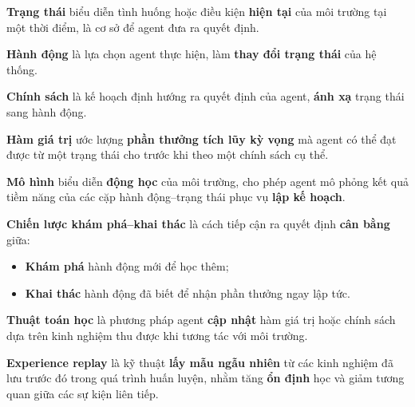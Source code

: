 \begin{dinhnghia}[title={State (Trạng thái)}]
\textbf{Trạng thái} biểu diễn tình huống hoặc điều kiện \textbf{hiện tại} của môi trường tại một thời điểm, là cơ sở để agent đưa ra quyết định.
\end{dinhnghia}

\begin{dinhnghia}[title={Action (Hành động)}]
\textbf{Hành động} là lựa chọn agent thực hiện, làm \textbf{thay đổi trạng thái} của hệ thống.
\end{dinhnghia}

\begin{dinhnghia}[title={Policy (Chính sách)}]
\textbf{Chính sách} là kế hoạch định hướng ra quyết định của agent, \textbf{ánh xạ} trạng thái sang hành động.
\end{dinhnghia}

\begin{dinhnghia}[title={Value Function (Hàm giá trị)}]
\textbf{Hàm giá trị} ước lượng \textbf{phần thưởng tích lũy kỳ vọng} mà agent có thể đạt được từ một trạng thái cho trước khi theo một chính sách cụ thể.
\end{dinhnghia}

\begin{dinhnghia}[title={Model (Mô hình)}]
\textbf{Mô hình} biểu diễn \textbf{động học} của môi trường, cho phép agent mô phỏng kết quả tiềm năng của các cặp hành động--trạng thái phục vụ \textbf{lập kế hoạch}.
\end{dinhnghia}

\begin{phuongphap}[title={Chiến lược khám phá--khai thác (Exploration--Exploitation)}]
\textbf{Chiến lược khám phá--khai thác} là cách tiếp cận ra quyết định \textbf{cân bằng} giữa:
\begin{itemize}
  \item \textbf{Khám phá} hành động mới để học thêm;
  \item \textbf{Khai thác} hành động đã biết để nhận phần thưởng ngay lập tức.
\end{itemize}
\end{phuongphap}

\begin{dinhnghia}[title={Learning Algorithm (Thuật toán học)}]
\textbf{Thuật toán học} là phương pháp agent \textbf{cập nhật} hàm giá trị hoặc chính sách dựa trên kinh nghiệm thu được khi tương tác với môi trường.
\end{dinhnghia}

\begin{phuongphap}[title={Experience Replay (Bộ nhớ kinh nghiệm)}]
\textbf{Experience replay} là kỹ thuật \textbf{lấy mẫu ngẫu nhiên} từ các kinh nghiệm đã lưu trước đó trong quá trình huấn luyện, nhằm tăng \textbf{ổn định} học và giảm tương quan giữa các sự kiện liên tiếp.
\end{phuongphap}

